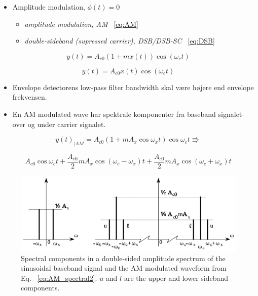 \begin{itemize}
	\item Amplitude modulation, $\phi(t) = 0$
	\begin{itemize}
		\item \textit{amplitude modulation, AM} ~\ref{eq:AM}
		\item \textit{double-sideband (supressed carrier), DSB/DSB-SC} ~\ref{eq:DSB}
	\end{itemize}
\end{itemize} 

\begin{equation}\label{eq:AM}
y(t) = A_{c0}(1+m x(t)) \cos(\omega_c t)
\end{equation}

\begin{equation}\label{eq:DSB}
y(t) = A_{c0} x(t) \cos(\omega_c t)
\end{equation}

\begin{itemize}
	\item Envelope detectorens low-pass filter bandwidth skal være højere end envelope frekvensen. 
	\item En AM modulated wave har spektrale komponenter fra baseband signalet over og under carrier signalet. 
\end{itemize}

\begin{equation}\label{eq:AM_spectral1}
y(t)_{|AM} = A_{c0}(1+m A_x \cos \omega_x t) \cos \omega_c t \Rrightarrow
\end{equation}

\begin{equation}\label{eq:AM_spectral2}
A_{c0} \cos \omega_c t + \dfrac{A_{c0}}{2}m A_x \cos(\omega_c-\omega_x) t + \dfrac{A_{c0}}{2} m A_x \cos(\omega_c+\omega_x) t
\end{equation}

\begin{figure} [H]
	\centering
	\includegraphics[width=0.85\linewidth]{graphics/5.png}
	\caption{ Spectral components in a double-sided amplitude spectrum of the sinusoidal baseband signal and the AM modulated waveform from Eq. ~\ref{eq:AM_spectral2}. $u$ and $l$ are the	upper and lower sideband components.}
	\label{fig:5}
\end{figure}


